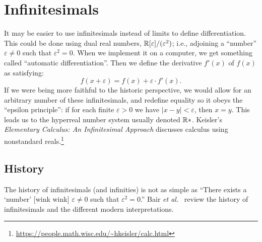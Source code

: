 \chapter{Infinitesimals}

\M
It may be easier to use infinitesimals instead of limits to define
differentiation. This could be done using dual real numbers,
$\mathbb{R}[\varepsilon]/(\varepsilon^{2})$; i.e., adjoining a ``number''
$\varepsilon\neq0$ such that $\varepsilon^{2}=0$. When we implement it
on a computer, we get something called ``automatic differentiation''.
Then we define the derivative $f'(x)$ of $f(x)$ as satisfying:
\begin{equation}
f(x + \varepsilon) = f(x) + \varepsilon\cdot f'(x).
\end{equation}
If we were being more faithful to the historic perspective, we would
allow for an arbitrary number of these infinitesimals, and redefine
equality so it obeys the ``epsilon principle'': if for each finite
$\varepsilon>0$ we have $|x - y|<\varepsilon$, then $x=y$. This leads us
to the hyperreal number system
usually denoted $\mathbb{R}*$. Keisler's \textit{Elementary Calculus: An Infinitesimal Approach}
discusses calculus using nonstandard reals.\footnote{\url{https://people.math.wisc.edu/~hkeisler/calc.html}}

\section{History}

\M
The history of infinitesimals (and infinities) is not as simple as
``There exists a `number' [wink wink] $\varepsilon\neq0$ such that
$\varepsilon^{2}=0$.''
Bair \textit{et al.}~\cite{Bair2016:interpreting} review the history of
infinitesimals and the different modern interpretations.


